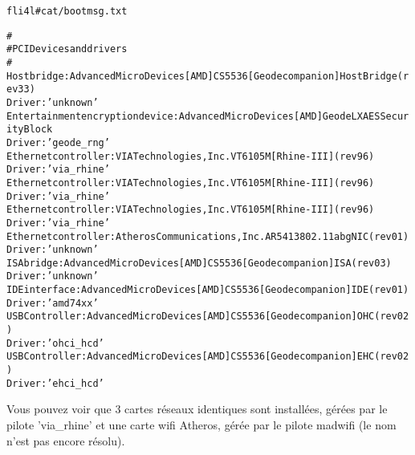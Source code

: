 \begin{example}
\begin{alltt}
fli4l \version # cat /bootmsg.txt

#
# PCI Devices and drivers
#
Host bridge: Advanced Micro Devices [AMD] CS5536 [Geode companion] Host Bridge (rev 33)
Driver: 'unknown'
Entertainment encryption device: Advanced Micro Devices [AMD] Geode LX AES Security Block
Driver: 'geode_rng'
Ethernet controller: VIA Technologies, Inc. VT6105M [Rhine-III] (rev 96)
Driver: 'via_rhine'
Ethernet controller: VIA Technologies, Inc. VT6105M [Rhine-III] (rev 96)
Driver: 'via_rhine'
Ethernet controller: VIA Technologies, Inc. VT6105M [Rhine-III] (rev 96)
Driver: 'via_rhine'
Ethernet controller: Atheros Communications, Inc. AR5413 802.11abg NIC (rev 01)
Driver: 'unknown'
ISA bridge: Advanced Micro Devices [AMD] CS5536 [Geode companion] ISA (rev 03)
Driver: 'unknown'
IDE interface: Advanced Micro Devices [AMD] CS5536 [Geode companion] IDE (rev 01)
Driver: 'amd74xx'
USB Controller: Advanced Micro Devices [AMD] CS5536 [Geode companion] OHC (rev 02)
Driver: 'ohci_hcd'
USB Controller: Advanced Micro Devices [AMD] CS5536 [Geode companion] EHC (rev 02)
Driver: 'ehci_hcd'
\end{alltt}
\end{example}

Vous pouvez voir que 3 cartes réseaux identiques sont installées, gérées par
le pilote 'via\_rhine' et une carte wifi Atheros, gérée par le pilote madwifi
(le nom n'est pas encore résolu).

